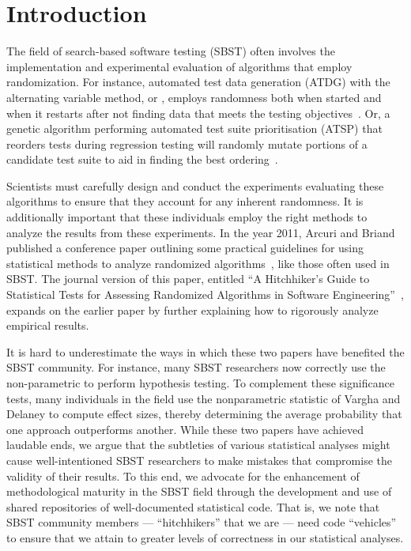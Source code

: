 
\section{Introduction}
\label{sec:introduction}

The field of search-based software testing (SBST) often involves the implementation and experimental evaluation of
algorithms that employ randomization. For instance, automated test data generation (ATDG) with the alternating variable
method, or \AVM, employs randomness both when started and when it restarts after not finding data that meets the testing
objectives~\cite{McMinn2015}. Or, a genetic algorithm performing automated test suite prioritisation (ATSP) that
reorders tests during regression testing will randomly mutate portions of a candidate test suite to aid in finding the
best ordering~\cite{Walcott2006}.

Scientists must carefully design and conduct the experiments evaluating these algorithms to ensure that they account for
any inherent randomness. It is additionally important that these individuals employ the right methods to analyze the
results from these experiments. In the year 2011, Arcuri and Briand published a conference paper outlining some
practical guidelines for using statistical methods to analyze randomized algorithms~\cite{Arcuri2011}, like those often
used in SBST. The journal version of this paper, entitled ``A Hitchhiker's Guide to Statistical Tests for Assessing
Randomized Algorithms in Software Engineering''~\cite{Arcuri2014}, expands on the earlier paper by further explaining
how to rigorously analyze empirical results.

It is hard to underestimate the ways in which these two papers have benefited the SBST community. For instance, many
SBST researchers now correctly use the non-parametric \wilcoxon to perform hypothesis testing. To complement these
significance tests, many individuals in the field use the nonparametric \atwelve statistic of Vargha and Delaney
\cite{Vargha2000} to compute effect sizes, thereby determining the average probability that one approach outperforms
another. While these two papers have achieved laudable ends, we argue that the subtleties of various statistical
analyses might cause well-intentioned SBST researchers to make mistakes that compromise the validity of their results.
To this end, we advocate for the enhancement of methodological maturity in the SBST field through the development and
use of shared repositories of well-documented statistical code. That is, we note that SBST community members ---
``hitchhikers'' that we are --- need code ``vehicles'' to ensure that we attain to greater levels of correctness in our
statistical analyses.

